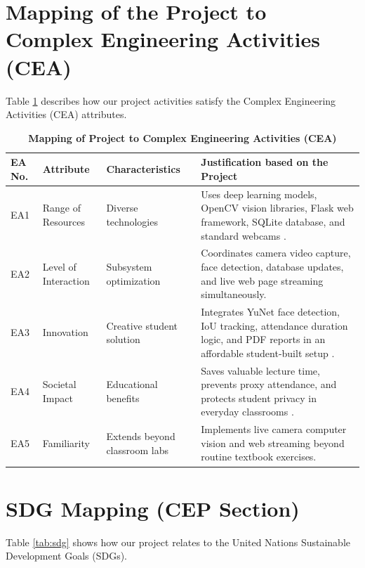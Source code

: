 \documentclass[10pt]{report}
\begin{document}
\section{Mapping of the Project to Complex Engineering Activities (CEA)}
\hspace{0.5cm}Table \ref{tab:cea} describes how our project activities satisfy the Complex Engineering Activities (CEA) attributes.

\begin{table}[H]
\caption{\textbf{Mapping of Project to Complex Engineering Activities (CEA)}}
\label{tab:cea}
\vspace{0.3cm}
\centering
\renewcommand{\arraystretch}{1.3}
\begin{tabular}{|p{1.2cm}|p{2.8cm}|p{4.0cm}|p{7.0cm}|}
\hline
\textbf{EA No.} & \textbf{Attribute} & \textbf{Characteristics} & \textbf{Justification based on the Project} \\
\hline
EA1 & Range of Resources & Diverse technologies & Uses deep learning models, OpenCV vision libraries, Flask web framework, SQLite database, and standard webcams \cite{zhang2023realtime, angulakshmi2024face}. \\
\hline
EA2 & Level of Interaction & Subsystem optimization & Coordinates camera video capture, face detection, database updates, and live web page streaming simultaneously. \\
\hline
EA3 & Innovation & Creative student solution & Integrates YuNet face detection, IoU tracking, attendance duration logic, and PDF reports in an affordable student-built setup \cite{zhu2023tracking}. \\
\hline
EA4 & Societal Impact & Educational benefits & Saves valuable lecture time, prevents proxy attendance, and protects student privacy in everyday classrooms \cite{raj2024facial, rajesh2023smart}. \\
\hline
EA5 & Familiarity & Extends beyond classroom labs & Implements live camera computer vision and web streaming beyond routine textbook exercises. \\
\hline
\end{tabular}
\end{table}

\section{SDG Mapping (CEP Section)}
\hspace{0.5cm}Table \ref{tab:sdg} shows how our project relates to the United Nations Sustainable Development Goals (SDGs).
\end{document}
